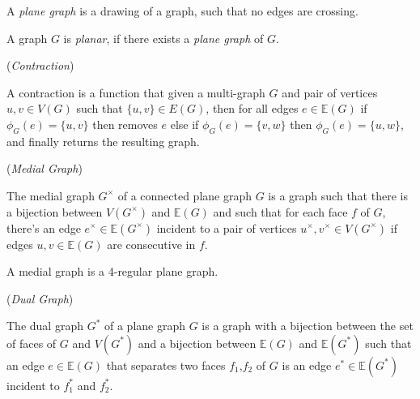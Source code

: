 \documentclass{article}
\begin{document}
	A \textit{plane graph} is a drawing of a graph, such that no edges are crossing.
	
	A graph $G$ is \textit{planar}, if there exists a \textit{plane graph} of $G$.

	\begin{definition}
		(\textit{Contraction})

		A contraction is a function that given a multi-graph $G$ and pair of vertices $u,v \in V(G)$ such that $\{u,v\} \in E(G)$, then for all edges $e \in \mathbb{E}(G)$ if $\phi_G(e) = \{u,v\}$ then removes $e$ else if $\phi_G(e) = \{v,w\}$ then $\phi_G(e) = \{u,w\}$, and finally returns the resulting graph.
	\end{definition}

	\begin{center}
		
	\end{center}
	
	\begin{definition}
		(\textit{Medial Graph})
		
		The medial graph $G^\times$ of a connected plane graph $G$ is a graph such that there is a bijection between $V(G^\times)$ and $\mathbb{E}(G)$ and such that for each face $f$ of $G$, there's an edge $e^\times \in \mathbb{E}(G^\times)$ incident to a pair of vertices $u^\times,v^\times \in V(G^\times)$ if edges $u,v \in \mathbb{E}(G)$ are consecutive in $f$.
	\end{definition}

	\begin{center}
		
	\end{center}
	
	\begin{corollary}
		A medial graph is a 4-regular plane graph.
	\end{corollary}

	\begin{definition}
		(\textit{Dual Graph})

		The dual graph $G^*$ of a plane graph $G$ is a graph with a bijection between the set of faces of $G$ and $V(G^*)$ and a bijection between $\mathbb{E}(G)$ and $\mathbb{E}(G^*)$ such that an edge $e \in \mathbb{E}(G)$ that separates two faces $f_1$,$f_2$ of $G$ is an edge $e^* \in \mathbb{E}(G^*)$ incident to $f_1^*$ and $f_2^*$.
	\end{definition}

	\begin{center}
		
	\end{center}
\end{document}
